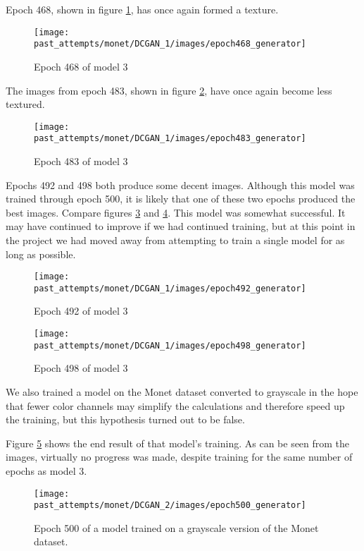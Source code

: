 \documentclass[11pt,letterpaper]{article}
\begin{document}
				Epoch 468, shown in figure \ref{fig:cgm:epoch468generator}, has once again formed a texture.
				\begin{figure}
					\centering
					\texttt{[image: past\_attempts/monet/DCGAN\_1/images/epoch468\_generator]}
					\caption[]{Epoch 468 of model 3}
					\label{fig:cgm:epoch468generator}
				\end{figure}

				The images from epoch 483, shown in figure \ref{fig:cgm:epoch483generator}, have once again become less textured.
				\begin{figure}
					\centering
					\texttt{[image: past\_attempts/monet/DCGAN\_1/images/epoch483\_generator]}
					\caption[]{Epoch 483 of model 3}
					\label{fig:cgm:epoch483generator}
				\end{figure}

				Epochs 492 and 498 both produce some decent images.
				Although this model was trained through epoch 500, it is likely that one of these two epochs produced the best images.
				Compare figures \ref{fig:cgm:epoch492generator} and \ref{fig:cgm:epoch498generator}.
				This model was somewhat successful.
				It may have continued to improve if we had continued training, but at this point in the project we had moved away from attempting to train a single model for as long as possible.
				\begin{figure}
					\centering
					\texttt{[image: past\_attempts/monet/DCGAN\_1/images/epoch492\_generator]}
					\caption[]{Epoch 492 of model 3}
					\label{fig:cgm:epoch492generator}
				\end{figure}

				\begin{figure}
					\centering
					\texttt{[image: past\_attempts/monet/DCGAN\_1/images/epoch498\_generator]}
					\caption[]{Epoch 498 of model 3}
					\label{fig:cgm:epoch498generator}
				\end{figure}

				We also trained a model on the Monet dataset converted to grayscale in the hope that fewer color channels may simplify the calculations and therefore speed up the training, but this hypothesis turned out to be false.

				Figure \ref{fig:cgm:gray:epoch500generator} shows the end result of that model's training.
				As can be seen from the images, virtually no progress was made, despite training for the same number of epochs as model 3.
				\begin{figure}
					\centering
					\texttt{[image: past\_attempts/monet/DCGAN\_2/images/epoch500\_generator]}
					\caption{Epoch 500 of a model trained on a grayscale version of the Monet dataset.}
					\label{fig:cgm:gray:epoch500generator}
				\end{figure}
\end{document}
